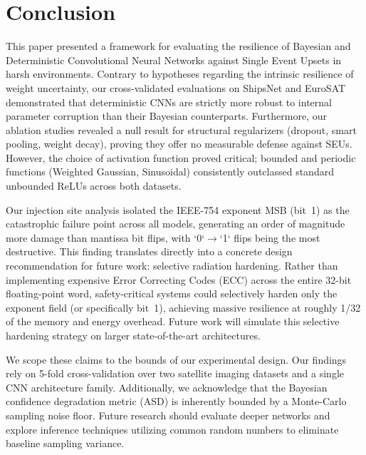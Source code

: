 \documentclass[a4paper,twoside]{article}
\begin{document}
\section{Conclusion}
\label{sec:conclusion}

This paper presented a framework for evaluating the resilience of Bayesian and Deterministic Convolutional Neural Networks against Single Event Upsets in harsh environments. Contrary to hypotheses regarding the intrinsic resilience of weight uncertainty, our cross-validated evaluations on ShipsNet and EuroSAT demonstrated that deterministic CNNs are strictly more robust to internal parameter corruption than their Bayesian counterparts. Furthermore, our ablation studies revealed a null result for structural regularizers (dropout, smart pooling, weight decay), proving they offer no measurable defense against SEUs. However, the choice of activation function proved critical; bounded and periodic functions (Weighted Gaussian, Sinusoidal) consistently outclassed standard unbounded ReLUs across both datasets.

Our injection site analysis isolated the IEEE-754 exponent MSB (bit~1) as the catastrophic failure point across all models, generating an order of magnitude more damage than mantissa bit flips, with `0`$\rightarrow$`1` flips being the most destructive. This finding translates directly into a concrete design recommendation for future work: selective radiation hardening. Rather than implementing expensive Error Correcting Codes (ECC) across the entire 32-bit floating-point word, safety-critical systems could selectively harden only the exponent field (or specifically bit~1), achieving massive resilience at roughly 1/32 of the memory and energy overhead. Future work will simulate this selective hardening strategy on larger state-of-the-art architectures.

We scope these claims to the bounds of our experimental design. Our findings rely on 5-fold cross-validation over two satellite imaging datasets and a single CNN architecture family. Additionally, we acknowledge that the Bayesian confidence degradation metric (ASD) is inherently bounded by a Monte-Carlo sampling noise floor. Future research should evaluate deeper networks and explore inference techniques utilizing common random numbers to eliminate baseline sampling variance.


{\small
}
\end{document}
